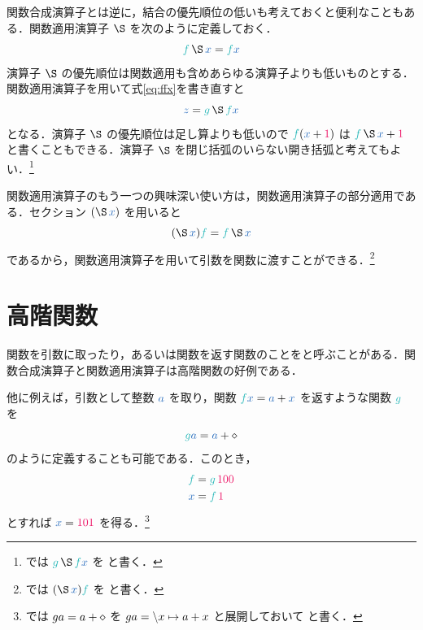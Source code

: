 \documentclass[a5paper,twoside,fleqn,draft]{jsbook}
\begin{document}
関数合成演算子とは逆に，結合の優先順位の低いも考えておくと便利なこともある．関数適用演算子 $\hApply$ を次のように定義しておく．
\begin{equation}
  \hFunc{f}\hApply\hVar{x}
  =\hFunc{f}\hVar{x}
\end{equation}
演算子 $\hApply$ の優先順位は関数適用も含めあらゆる演算子よりも低いものとする．関数適用演算子を用いて式\eqref{eq:ffx}を書き直すと
\begin{equation}
  \hVar{z}
  =\hFunc{g}\hApply\hFunc{f}\hVar{x}
\end{equation}
となる．演算子 $\hApply$ の優先順位は足し算よりも低いので $\hFunc{f}(\hVar{x}+\hConstant{1})$ は $\hFunc{f}\hApply\hVar{x}+\hConstant{1}$ と書くこともできる．演算子 $\hApply$ を閉じ括弧のいらない開き括弧と考えてもよい．\footnote{\haskell では $\hFunc{g}\hApply\hFunc{f}\hVar{x}$ を  と書く．}

関数適用演算子のもう一つの興味深い使い方は，関数適用演算子の部分適用である．セクション $(\hApply\hVar{x})$ を用いると
\begin{equation}
  (\hApply\hVar{x})\hFunc{f}
  =\hFunc{f}\hApply\hVar{x}
\end{equation}
であるから，関数適用演算子を用いて引数を関数に渡すことができる．\footnote{\haskell では $(\hApply\hVar{x})\hFunc{f}$ を  と書く．}

\section{高階関数}

関数を引数に取ったり，あるいは関数を返す関数のことをと呼ぶことがある．関数合成演算子と関数適用演算子は高階関数の好例である．

他に例えば，引数として整数 $\hVar{a}$ を取り，関数 $\hFunc{f}\hVar{x}=\hVar{a}+\hVar{x}$ を返すような関数 $\hFunc{g}$ を
\begin{equation}
  \hFunc{g}\hVar{a}
  =\hVar{a}+\hAnonParam
\end{equation}
のように定義することも可能である．このとき，
\begin{align}
  \hFunc{f}
  &=\hFunc{g}\,\hConstant{100}\\
  \hVar{x}
  &=\hFunc{f}\,\hConstant{1}
\end{align}
とすれば $\hVar{x}=\hConstant{101}$ を得る．\footnote{\haskell では $ga=a+\diamond$ を $ga=\backslash x\mapsto a+x$ と展開しておいて  と書く．}
\end{document}

